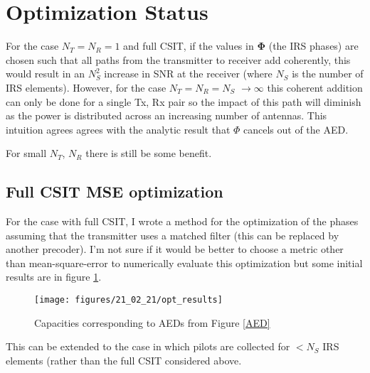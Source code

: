 \documentclass[12pt,a4paper]{article}
\begin{document}
\section{Optimization Status}\label{opt_section}
For the case $N_T = N_R = 1$ and full CSIT, if the values in $\boldsymbol{\Phi}$ (the IRS phases) are chosen such that all paths from the transmitter to receiver add coherently, this would result in an $N_S^2$ increase in SNR at the receiver (where $N_S$ is the number of IRS elements). However, for the case $N_T = N_R = N_S$ $\rightarrow \infty$ this coherent addition can only be done for a single Tx, Rx pair so the impact of this path will diminish as the power is distributed across an increasing number of antennas. This intuition agrees agrees with the analytic result that $\Phi$ cancels out of the AED.
\par
For small $N_T$, $N_R$ there is still be some benefit. 
\subsection{Full CSIT MSE optimization}
For the case with full CSIT, I wrote a method for the optimization of the phases assuming that the transmitter uses a matched filter (this can be replaced by another precoder). I'm not sure if it would be better to choose a metric other than mean-square-error to numerically evaluate this optimization but some initial results are in figure \ref{opt_results}.

		\begin{figure}[H]
	\texttt{[image: figures/21\_02\_21/opt\_results]}
	  \caption{Capacities corresponding to AEDs from Figure \ref{AED}}
	  \label{opt_results}
	\end{figure}

This can be extended to the case in which pilots are collected for $< N_S$  IRS elements (rather than the full CSIT considered above.

\end{document}
